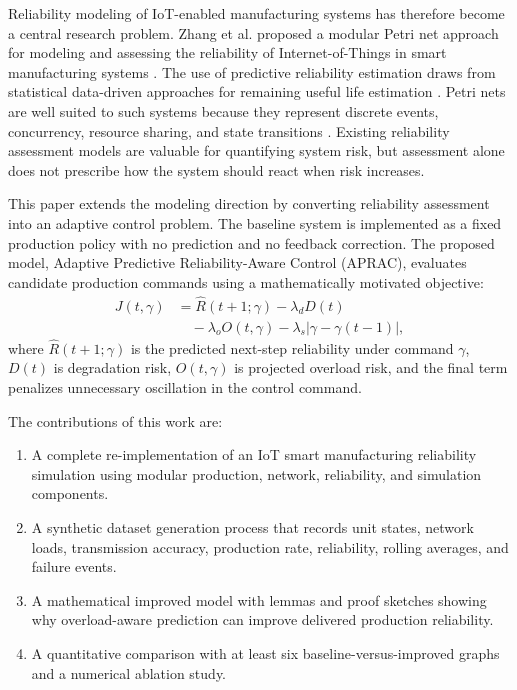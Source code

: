 \documentclass[journal]{IEEEtran}
\begin{document}
Reliability modeling of IoT-enabled manufacturing systems has therefore become a central research problem. Zhang et al. proposed a modular Petri net approach for modeling and assessing the reliability of Internet-of-Things in smart manufacturing systems \cite{zhang2025iotpetri}. The use of predictive reliability estimation draws from statistical data-driven approaches for remaining useful life estimation \cite{si2011remaining,si2012remaining}. Petri nets are well suited to such systems because they represent discrete events, concurrency, resource sharing, and state transitions \cite{murata1989petri,murata1996petri,cassandras2008discrete,cassandras2010discrete}. Existing reliability assessment models are valuable for quantifying system risk, but assessment alone does not prescribe how the system should react when risk increases.

This paper extends the modeling direction by converting reliability assessment into an adaptive control problem. The baseline system is implemented as a fixed production policy with no prediction and no feedback correction. The proposed model, Adaptive Predictive Reliability-Aware Control (APRAC), evaluates candidate production commands using a mathematically motivated objective:
\begin{equation}
\begin{aligned}
J(t,\gamma)
&=\widehat{R}(t+1;\gamma)-\lambda_d D(t)\\
&\quad-\lambda_o O(t,\gamma)
-\lambda_s|\gamma-\gamma(t-1)|,
\end{aligned}
\end{equation}
where $\widehat{R}(t+1;\gamma)$ is the predicted next-step reliability under command $\gamma$, $D(t)$ is degradation risk, $O(t,\gamma)$ is projected overload risk, and the final term penalizes unnecessary oscillation in the control command.

The contributions of this work are:
\begin{enumerate}[leftmargin=*]
    \item A complete re-implementation of an IoT smart manufacturing reliability simulation using modular production, network, reliability, and simulation components.
    \item A synthetic dataset generation process that records unit states, network loads, transmission accuracy, production rate, reliability, rolling averages, and failure events.
    \item A mathematical improved model with lemmas and proof sketches showing why overload-aware prediction can improve delivered production reliability.
    \item A quantitative comparison with at least six baseline-versus-improved graphs and a numerical ablation study.
\end{enumerate}
\end{document}
